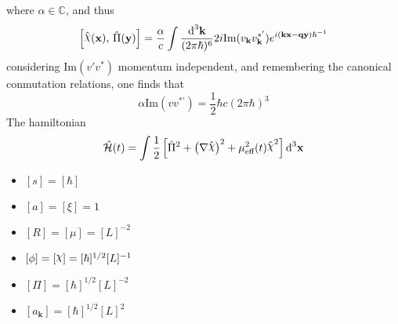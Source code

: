 \documentclass[pt=11, openany,twoside,a4paper]{scrbook}
\DeclareRobustCommand{\rchi}{{\mathpalette\irchi\relax}}
\newcommand{\irchi}[2]{\raisebox{\depth}{$#1\chi$}} %
\begin{document}
	where $\alpha\in\mathbb{C}$, and thus
	\begin{equation}
		\left[\hat{\rchi}(\mathbf{x}),\,\hat{\Pi}(\mathbf{y})\right]=\frac{\alpha}{c}\int\frac{\td^3\mathbf{k}}{(2\pi\hbar)^6}2i\text{Im}(v_\mathbf{k}v_\mathbf{k}^{*'})e^{i(\mathbf{kx}-\mathbf{qy})\hbar^{-1}}
	\end{equation}
	considering Im$(v'v^*)$ momentum independent, and remembering the canonical conmutation relations, one finds that
	\begin{equation}
		\alpha\text{Im}(vv^{*'})=\frac{1}{2}\hbar c(2\pi\hbar)^3
	\end{equation}
	The hamiltonian
	\begin{equation}
		\hat{\mathcal{H}}(t)=\int\frac{1}{2}\left[\hat{\Pi}^2+\left(\mathbf{\nabla}\hat{\rchi}\right)^2+\mu_{\text{eff}}^2(t)\hat{\rchi}^2\right]\td^3\mathbf{x}
	\end{equation}
	
	\backmatter
	\appendix
	\begin{itemize}
		\item $[s]=[\hbar]$
		\item $[a]=[\xi]=1$
		\item $[R]=[\mu]=[L]^{-2}$
		\item $[\phi]=[\rchi]=[\hbar]^{1/2}[L]^{-1}$
		\item $[\Pi]=[\hbar]^{1/2}[L]^{-2}$
		\item $[a_\mathbf{k}]=[\hbar]^{1/2}[L]^2$
	\end{itemize}
	\nocite{*}
\end{document}
